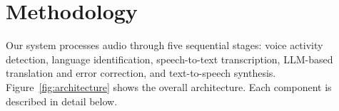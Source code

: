 
\section{Methodology}
\label{sec:method}

Our system processes audio through five sequential stages: voice activity detection, language identification, speech-to-text transcription, LLM-based translation and error correction, and text-to-speech synthesis. Figure~\ref{fig:architecture} shows the overall architecture. Each component is described in detail below.

